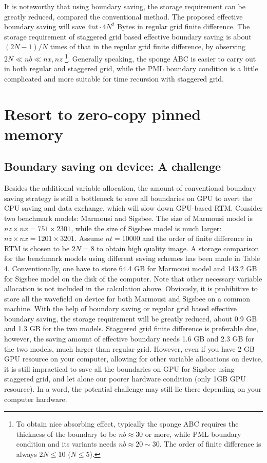 It is noteworthy that using boundary saving, the storage requirement can be greatly reduced, compared the conventional method. The proposed effective boundary saving will save $4nt\cdot 4N^2$ Bytes in regular grid finite difference. The storage requirement of staggered grid based effective boundary saving is about $(2N-1)/N$ times of that in the regular grid finite difference, by observing $2N\ll nb\ll nx,nz$ \footnote{To obtain nice absorbing effect, typically the sponge ABC requires the thickness of the boundary to be $nb\approx30$ or more, while PML boundary condition and its variants needs $nb\approx 20\sim 30$. The order of finite difference is always $2N\leq 10$ ($N\leq 5$).}. Generally speaking, the sponge ABC is easier to carry out in both regular and staggered grid, while the PML boundary condition is a little complicated and more suitable for time recursion with staggered grid.


\section{Resort to zero-copy pinned memory}

\subsection{Boundary saving on device: A challenge}

Besides the additional variable allocation, the amount of conventional boundary saving strategy is still a bottleneck to save all boundaries on GPU to avert the CPU saving and data exchange, which will slow down GPU-based RTM. Consider two benchmark models: Marmousi and Sigsbee. The size of Marmousi model is $nz\times nx=751\times 2301$, while the size of Sigsbee model is much larger: $nz\times nx=1201\times3201$. Assume $nt=10000$ and the order of finite difference in RTM is chosen to be  $2N=8$ to obtain high quality image. A storage comparison for the benchmark models using different saving schemes has been made in Table 4.
Conventionally, one have to store 64.4 GB for Marmousi model and 143.2 GB for Sigsbee model on the disk of the computer.
Note that other necessary variable allocation is not included in the calculation above. Obviously, it is prohibitive to store all the wavefield on device for both Marmousi and Sigsbee on a common machine. With the help of \cite{dussaud2008computational} boundary saving or regular grid based effective boundary saving, the storage requirement will be greatly reduced, about 0.9 GB and 1.3 GB for the two models. Staggered grid finite difference is preferable due, however, the saving amount of effective boundary needs 1.6 GB and 2.3 GB for the two models, much larger than regular grid. However, even if you have 2 GB GPU resource on your computer, allowing for other variable allocations on device, it is still impractical to save all the boundaries on GPU for Sigsbee using staggered grid, and let alone our poorer hardware condition (only 1GB GPU resource). In a word, the potential challenge may still lie there depending on your computer hardware.


